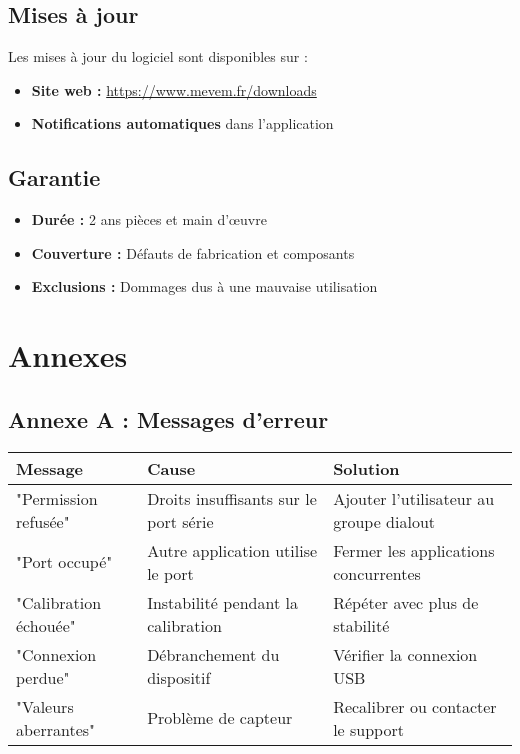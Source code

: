 \documentclass[12pt,a4paper]{article}
\begin{document}
\subsection{Mises à jour}

Les mises à jour du logiciel sont disponibles sur :
\begin{itemize}
    \item \textbf{Site web :} \url{https://www.mevem.fr/downloads}
    \item \textbf{Notifications automatiques} dans l'application
\end{itemize}

\subsection{Garantie}

\begin{itemize}
    \item \textbf{Durée :} 2 ans pièces et main d'œuvre
    \item \textbf{Couverture :} Défauts de fabrication et composants
    \item \textbf{Exclusions :} Dommages dus à une mauvaise utilisation
\end{itemize}

\section{Annexes}

\subsection{Annexe A : Messages d'erreur}

\begin{longtable}{|p{4cm}|p{5cm}|p{5cm}|}
\hline
\textbf{Message} & \textbf{Cause} & \textbf{Solution} \\
\hline
\endhead
"Permission refusée" & Droits insuffisants sur le port série & Ajouter l'utilisateur au groupe dialout \\
\hline
"Port occupé" & Autre application utilise le port & Fermer les applications concurrentes \\
\hline
"Calibration échouée" & Instabilité pendant la calibration & Répéter avec plus de stabilité \\
\hline
"Connexion perdue" & Débranchement du dispositif & Vérifier la connexion USB \\
\hline
"Valeurs aberrantes" & Problème de capteur & Recalibrer ou contacter le support \\
\hline
\end{longtable}
\end{document}
